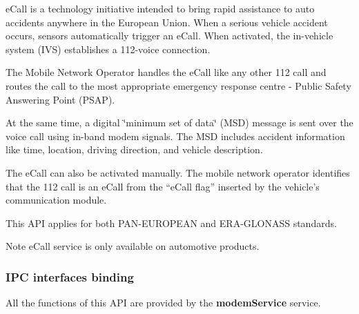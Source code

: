 e\+Call is a technology initiative intended to bring rapid assistance to auto accidents anywhere in the European Union. When a serious vehicle accident occurs, sensors automatically trigger an e\+Call. When activated, the in-\/vehicle system (I\+V\+S) establishes a 112-\/voice connection.

The Mobile Network Operator handles the e\+Call like any other 112 call and routes the call to the most appropriate emergency response centre -\/ Public Safety Answering Point (P\+S\+A\+P).

At the same time, a digital \char`\"{}minimum set of data\char`\"{} (M\+S\+D) message is sent over the voice call using in-\/band modem signals. The M\+S\+D includes accident information like time, location, driving direction, and vehicle description.

The e\+Call can also be activated manually. The mobile network operator identifies that the 112 call is an e\+Call from the “e\+Call flag” inserted by the vehicle’s communication module.

This A\+P\+I applies for both P\+A\+N-\/\+E\+U\+R\+O\+P\+E\+A\+N and E\+R\+A-\/\+G\+L\+O\+N\+A\+S\+S standards.

\begin{DoxyNote}{Note}
e\+Call service is only available on automotive products.
\end{DoxyNote}
\hypertarget{c_ecall_le_ecall_binding}{}\subsubsection{I\+P\+C interfaces binding}\label{c_ecall_le_ecall_binding}
All the functions of this A\+P\+I are provided by the {\bfseries modem\+Service} service.

